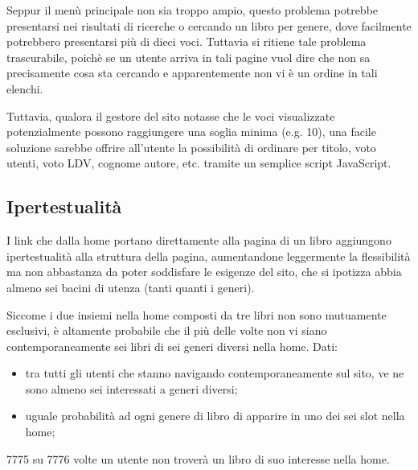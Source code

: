 Seppur il menù principale non sia troppo ampio, questo problema potrebbe
presentarsi nei risultati di ricerche o cercando un libro per genere, dove
facilmente potrebbero presentarsi più di dieci voci.
Tuttavia si ritiene tale problema trascurabile, poichè se un utente arriva in
tali pagine vuol dire che non sa precisamente cosa sta cercando e
apparentemente non vi è un ordine in tali elenchi.

Tuttavia, qualora il gestore del sito notasse che le voci visualizzate
potenzialmente possono raggiungere una soglia minima (e.g. 10), una facile
soluzione sarebbe offrire all'utente la possibilità di ordinare per titolo,
voto utenti, voto LDV, cognome autore, etc. tramite un semplice script
JavaScript.

\subsection{Ipertestualità}
I link che dalla home portano direttamente alla pagina di un libro aggiungono
ipertestualità alla struttura della pagina, aumentandone leggermente la
flessibilità ma non abbastanza da poter soddisfare le esigenze del sito, che
si ipotizza abbia almeno sei bacini di utenza (tanti quanti i generi).

Siccome i due insiemi nella home composti da tre libri non sono mutuamente
esclusivi, è altamente probabile che il più delle volte non vi siano
contemporaneamente sei libri di sei generi diversi nella home.
Dati:
\begin{itemize}
\item tra tutti gli utenti che stanno navigando contemporaneamente sul sito,
ve ne sono almeno sei interessati a generi diversi;
\item uguale probabilità ad ogni genere di libro di apparire in uno dei sei slot nella home;
\end{itemize}
7775 su 7776 volte un utente non troverà un libro di suo interesse nella home.
